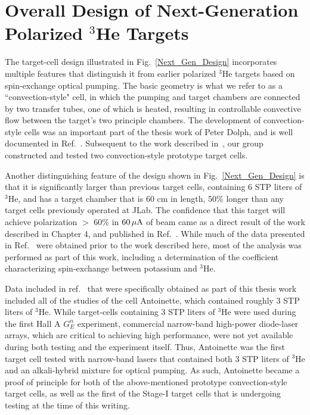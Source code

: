 \section{Overall Design of Next-Generation Polarized $^3$He Targets}

The target-cell design illustrated in Fig.~\ref{Next_Gen_Design} incorporates multiple features that distinguish it from earlier polarized $^3$He targets based on spin-exchange optical pumping. The basic geometry is what we refer to as a ``convection-style" cell, in which the pumping and target chambers are connected
by two transfer tubes, one of which is heated, resulting in controllable convective flow between the target's two principle chambers. The development of convection-style cells was an important part of the thesis work of Peter Dolph, and is well documented in Ref.~\cite{PhysRevC.84.065201}. Subsequent to the work described in~\cite{PhysRevC.84.065201}, our group constructed and tested two convection-style prototype target cells. 

Another distinguishing feature of the design shown in Fig.~\ref{Next_Gen_Design} is that it is significantly larger than previous target cells, containing 6 STP liters of $^3$He, and has a target chamber that is 60 cm in length, 50\% longer than any target cells previously operated at JLab.  The confidence that this target will achieve polarization $>$ 60\% in ${\rm 60\,\mu A}$ of beam came as a direct result of the work described in Chapter 4, and published in Ref.~\cite{PhysRevC.91.055205}. While much of the data presented in Ref.~\cite{PhysRevC.91.055205} were obtained prior to the work described here, most of the analysis was performed as part of this work, including a determination of the coefficient characterizing spin-exchange between potassium and $^3$He.  

Data included in ref.~\cite{PhysRevC.91.055205} that were specifically obtained as part of this thesis work included all of the studies of the cell Antoinette, which contained roughly 3 STP liters of $^3$He. While target-cells containing 3 STP liters of $^3$He were used during the first Hall A $G_E^n$ experiment, commercial narrow-band high-power diode-laser arrays, which are critical to achieving high performance, were not yet available during both testing and the experiment itself. Thus, Antoinette was the first target cell tested with narrow-band lasers that contained both 3 STP liters of $^3$He and an alkali-hybrid mixture for optical pumping. As such, Antoinette became a proof of principle for both of the above-mentioned prototype convection-style target cells, as well as the first of the Stage-I target cells that is undergoing testing at the time of this writing.

